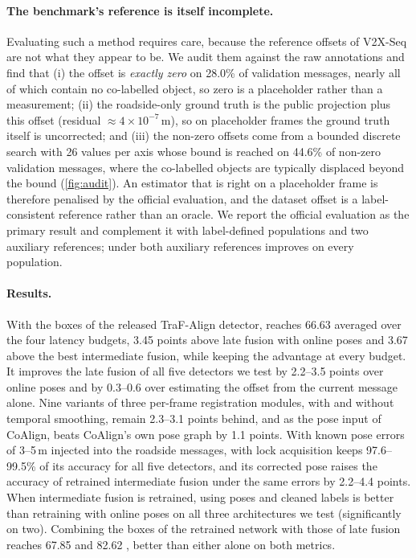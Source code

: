 \paragraph{The benchmark's reference is itself incomplete.}
Evaluating such a method requires care, because the reference offsets of V2X-Seq are not what they appear to be.
We audit them against the raw annotations and find that (i) the offset is \emph{exactly zero} on 28.0\% of validation messages, nearly all of which contain no co-labelled object, so zero is a placeholder rather than a measurement; (ii) the roadside-only ground truth is the public projection plus this offset (residual $\approx4\times10^{-7}$\,m), so on placeholder frames the ground truth itself is uncorrected; and (iii) the non-zero offsets come from a bounded discrete search with 26 values per axis whose bound is reached on 44.6\% of non-zero validation messages, where the co-labelled objects are typically displaced beyond the bound (\cref{fig:audit}).
An estimator that is right on a placeholder frame is therefore penalised by the official evaluation, and the dataset offset is a label-consistent reference rather than an oracle.
We report the official evaluation as the primary result and complement it with label-defined populations and two auxiliary references; under both auxiliary references \method improves on every population.

\paragraph{Results.}
With the boxes of the released TraF-Align detector, \method reaches 66.63 \apseven averaged over the four latency budgets, 3.45 points above late fusion with online poses and 3.67 above the best intermediate fusion, while keeping the advantage at every budget.
It improves the late fusion of all five detectors we test by 2.2--3.5 points over online poses and by 0.3--0.6 over estimating the offset from the current message alone. Nine variants of three per-frame registration modules, with and without temporal smoothing, remain 2.3--3.1 points behind, and as the pose input of CoAlign, \method beats CoAlign's own pose graph by 1.1 points.
With known pose errors of 3--5\,m injected into the roadside messages, \method with lock acquisition keeps 97.6--99.5\% of its accuracy for all five detectors, and its corrected pose raises the accuracy of retrained intermediate fusion under the same errors by 2.2--4.4 points.
When intermediate fusion is retrained, using \method poses and cleaned labels is better than retraining with online poses on all three architectures we test (significantly on two).
Combining the boxes of the retrained network with those of \method late fusion reaches 67.85 \apseven and 82.62 \apfive, better than either alone on both metrics.

